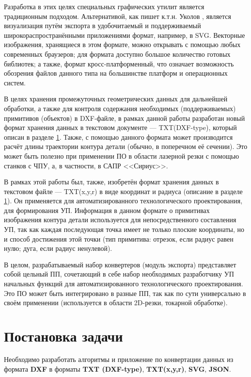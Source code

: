 Разработка в этих целях специальных графических утилит является традиционным подходом. Альтернативой, как пишет к.т.н. Уколов \cite{ukoloff}, является визуализация путём экспорта в удобочитаемый и поддерживаемый широкораспространёнными приложениями формат, например, в SVG. Векторные изображения, хранящиеся в этом формате, можно открывать с помощью любых современных браузеров; для формата доступно большое количество готовых библиотек; а также, формат кросс-платформенный, что означает возможность обозрения файлов данного типа на большинстве платформ и операционных систем.

В целях хранения промежуточных геометрических данных для дальнейшей обработки, а также для контроля содержания необходимых (поддерживаемых) примитивов (объектов) в DXF-файле, в рамках данной работы разработан новый формат хранения данных в текстовом документе --- TXT(DXF-type), который описан в разделе \ref{sec:aufgabe}. Также, с помощью данного формата может производится расчёт длины траектории  контура детали (обычно, в поперечном её сечении). Это может быть полезно при применении ПО в области лазерной резки с помощью станков с ЧПУ, а, в частности, в САПР <<Сириус>>.

В рамках этой работы был, также, изобретён формат хранения данных в текстовом файле --- TXT(x,y,r) в виде координат и радиуса (описание в разделе \ref{sec:aufgabe}). Он применяется для автоматизированного технологического проектирования, для формирования УП. Информация в данном формате о примитивах изображения контура детали используется для непосредственного составления УП, так как каждая последующая точка имеет не только плоские координаты, но и способ достижения этой точки (тип примитива: отрезок, если радиус равен нулю; дуга, если радиус ненулевой).

В целом, разрабатываемый набор конвертеров (модуль экспорта) представляет собой цельный ПП, сочетающий в себе набор необходимых разработчику УП начальных функций для автоматизированного технологического проектирования. Это ПО может быть интегрировано в разные ПП, так как по сути универсально в своём применении (используется в области 2D-резки, токарной обработке).


\section{Постановка задачи} \label{sec:aufgabe}

Необходимо разработать алгоритмы и приложение по конвертации данных из формата \textbf{DXF} в форматы \textbf{TXT (DXF-type)}, \textbf{TXT(x,y,r)}, \textbf{SVG}, \textbf{JSON}.

